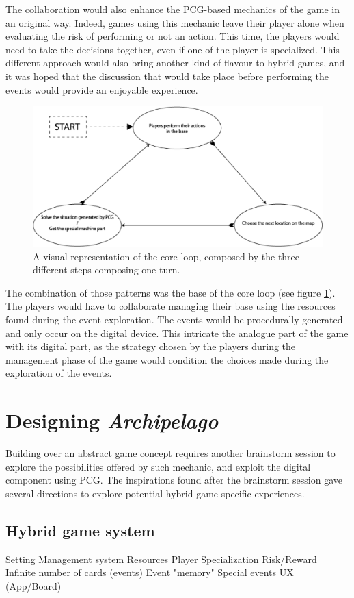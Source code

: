 The collaboration would also enhance the PCG-based mechanics of the game in an original way. Indeed, games using this mechanic leave their player alone when evaluating the risk of performing or not an action. This time, the players would need to take the decisions together, even if one of the player is specialized. This different approach would also bring another kind of flavour to hybrid games, and it was hoped that the discussion that would take place before performing the events would provide an enjoyable experience.
\begin{figure}[h]
    \centering
    \includegraphics[scale=0.5]{Images/Core loop.png}
    \caption{A visual representation of the core loop, composed by the three different steps composing one turn.}
    \label{fig:loop}
\end{figure}
The combination of those patterns was the base of the core loop (see figure \ref{fig:loop}). The players would have to collaborate managing their base using the resources found during the event exploration. The events would be procedurally generated and only occur on the digital device. This intricate the analogue part of the game with its digital part, as the strategy chosen by the players during the management phase of the game would condition the choices made during the exploration of the events.

\section{Designing \textit{Archipelago}}
Building over an abstract game concept requires another brainstorm session to explore the possibilities offered by such mechanic, and exploit the digital component using PCG. The inspirations found after the brainstorm session gave several directions to explore potential hybrid game specific experiences.
\subsection{Hybrid game system}
Setting
Management system
Resources
Player Specialization
Risk/Reward
Infinite number of cards (events)
Event "memory"
Special events
UX (App/Board)
